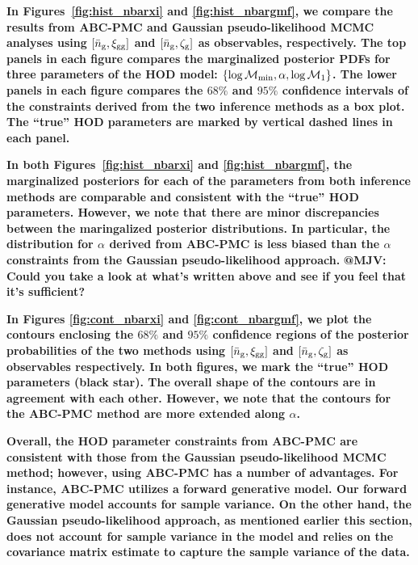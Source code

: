 \documentclass[fleqn,usenatbib]{mnras}
\begin{document}
{\bf \color{dred}
In Figures~\ref{fig:hist_nbarxi} and \ref{fig:hist_nbargmf}, we compare the results from
ABC-PMC and Gaussian pseudo-likelihood MCMC analyses using $[\bar{n}_{\mathrm{g}}, \xi_{\mathrm{gg}}]$ and 
$[\bar{n}_{\mathrm{g}}, \mathcal{\zeta}_{\rm g}]$ as observables, respectively. The top panels in each figure 
compares the marginalized posterior PDFs for three parameters of the HOD model: 
$\{\log \mathcal{M}_{\rm min}, \alpha, \log\mathcal{M}_1\}$. The lower panels in each 
figure compares the $68\%$ and $95\%$ confidence intervals of the constraints 
derived from the two inference methods as a box plot. The ``true'' HOD parameters
are marked by vertical dashed lines in each panel. 
}

{\bf \color{dred}
In both Figures~\ref{fig:hist_nbarxi} and \ref{fig:hist_nbargmf}, the marginalized 
posteriors for each of the parameters from both inference methods are comparable 
and consistent with the ``true'' HOD parameters. However, we note that there are 
minor discrepancies between the maringalized posterior distributions. In particular, 
the distribution for $\alpha$ derived from ABC-PMC is less biased than the $\alpha$ 
constraints from the Gaussian pseudo-likelihood approach. 
}
{\bf \color{darkgreen}
@MJV: Could you take a look at what's written above and see if you feel that it's sufficient? 
}

{\bf \color{dred}
In Figures \ref{fig:cont_nbarxi} and \ref{fig:cont_nbargmf}, we plot the contours 
enclosing the $68\%$ and $95\%$ confidence regions of the posterior probabilities of 
the two methods using $[\bar{n}_{\mathrm{g}}, \xi_{\mathrm{gg}}]$ and $[\bar{n}_{\mathrm{g}}, \mathcal{\zeta}_{\rm g}]$ as observables 
respectively. In both figures, we mark the ``true'' HOD parameters (black star). The 
overall shape of the contours are in agreement with each other. However, we note
that the contours for the ABC-PMC method are more extended along $\alpha$. 
}

{\bf \color{dred} 
Overall, the HOD parameter constraints from ABC-PMC are consistent with those from 
the Gaussian pseudo-likelihood MCMC method; however, using ABC-PMC has a number of 
advantages. For instance, ABC-PMC utilizes a forward generative model. Our forward 
generative model accounts for sample variance. On the other hand, the Gaussian 
pseudo-likelihood approach, as mentioned earlier this section, does not account 
for sample variance in the model and relies on the covariance matrix estimate to 
capture the sample variance of the data. 
}
\end{document}

